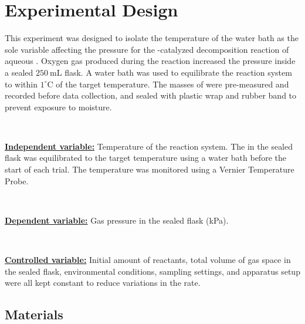 \documentclass[hyphens]{article}
\begin{document}
\section{Experimental Design}
\label{sec:research-design}
\indent \indent This experiment was designed to isolate the temperature of the water bath as the sole variable affecting the pressure for the -catalyzed decomposition reaction of aqueous . Oxygen gas produced during the reaction increased the pressure inside a sealed $250\ \text{mL}$ flask. A water bath was used to equilibrate the reaction system to within $1 ^\circ \text{C}$ of the target temperature. The masses of  were pre-measured and recorded before data collection, and sealed with plastic wrap and rubber band to prevent exposure to moisture.

\

\noindent \underline{\textbf{Independent variable:}} Temperature of the reaction system. The  in the sealed flask was equilibrated to the target temperature using a water bath before the start of each trial. The temperature was monitored using a Vernier Temperature Probe.

\

\noindent \underline{\textbf{Dependent variable:}} Gas pressure in the sealed flask (kPa).

\

\noindent \underline{\textbf{Controlled variable:}} Initial amount of reactants, total volume of gas space in the sealed flask, environmental conditions, sampling settings, and apparatus setup were all kept constant to reduce variations in the rate.

\subsection{Materials}
\label{sec:research-design-materials}
\end{document}
